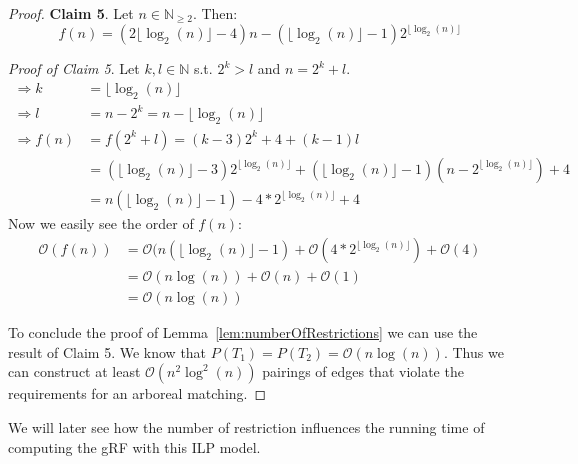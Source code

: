 \begin{proof}
\textbf{Claim 5}. Let $n \in \mathbb{N}_{\geq 2}$. Then:
$$f(n) = (2\lfloor \log_2(n) \rfloor -4)n - (\lfloor \log_2(n)\rfloor -1)2^{\lfloor \log_2(n) \rfloor}$$

\textit{Proof of Claim 5}. Let $k,l \in \mathbb{N}$ s.t. $2^k > l$ and $n = 2^k +l$.
\begin{align*}
\Rightarrow k &= \lfloor \log_2(n) \rfloor \\
\Rightarrow l &= n - 2^k = n - \lfloor \log_2(n) \rfloor \\
\Rightarrow f(n) &= f(2^k+l) = (k-3)2^k +4 + (k-1)l \\
&= (\lfloor \log_2(n) \rfloor -3)2^{\lfloor \log_2(n) \rfloor} + (\lfloor \log_2(n) \rfloor -1) (n-2^{\lfloor \log_2(n) \rfloor}) +4 \\
&= n(\lfloor \log_2(n) \rfloor -1) -4*2^{\lfloor \log_2(n) \rfloor} +4
\end{align*}
Now we easily see the order of $f(n)$:
\begin{align*}
\mathcal{O}(f(n)) &= \mathcal{O}(n(\lfloor \log_2(n) \rfloor -1) + \mathcal{O}(4*2^{\lfloor \log_2(n) \rfloor}) + \mathcal{O}(4) \\
&= \mathcal{O}(n\log(n)) +\mathcal{O}(n) +\mathcal{O}(1)\\
&= \mathcal{O}(n\log(n))
\end{align*}

To conclude the proof of Lemma~\ref{lem:numberOfRestrictions} we can use the result of Claim 5. We know that $P(T_1) = P(T_2) = \mathcal{O}(n\log(n))$. Thus we can construct at least $\mathcal{O}(n^2\log^2(n))$ pairings of edges that violate the requirements for an arboreal matching.
\end{proof}
We will later see how the number of restriction influences the running time of computing the gRF with this ILP model.